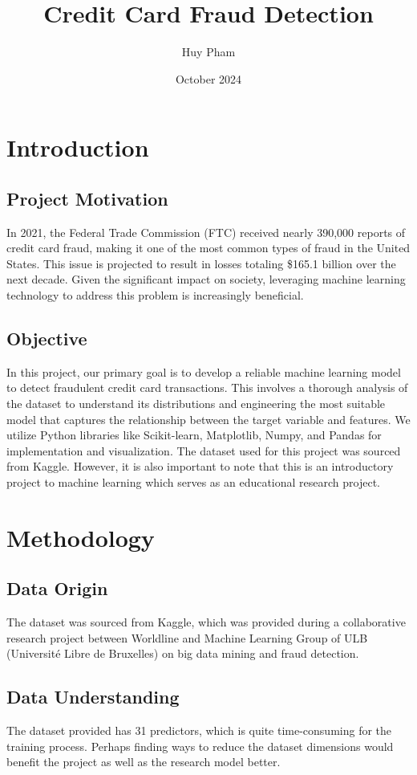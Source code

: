 \documentclass[12pt, letterpaper]{article}
\title{Credit Card Fraud Detection}
\author{Huy Pham}
\date{October 2024}
\begin{document}
\maketitle

\section{Introduction}
    \subsection{Project Motivation}
        In 2021, the Federal Trade Commission (FTC) received nearly 390,000 reports of credit card fraud, making it one of the most common types of fraud in the United States. This issue is projected to result in losses totaling \$165.1 billion over the next decade. Given the significant impact on society, leveraging machine learning technology to address this problem is increasingly beneficial.

    \subsection{Objective}
        In this project, our primary goal is to develop a reliable machine learning model to detect fraudulent credit card transactions. This involves a thorough analysis of the dataset to understand its distributions and engineering the most suitable model that captures the relationship between the target variable and features. We utilize Python libraries like Scikit-learn, Matplotlib, Numpy, and Pandas for implementation and visualization. The dataset used for this project was sourced from Kaggle. However, it is also important to note that this is an introductory project to machine learning which serves as an educational research project.
        
\section{Methodology}
    \subsection{Data Origin}
        The dataset was sourced from Kaggle, which was provided during a collaborative research project between Worldline and Machine Learning Group of ULB (Université Libre de Bruxelles) on big data mining and fraud detection.~\cite{Kaggle}
        
    \subsection{Data Understanding}
        The dataset provided has 31 predictors, which is quite time-consuming for the training process. Perhaps finding ways to reduce the dataset dimensions would benefit the project as well as the research model better.
\end{document}
